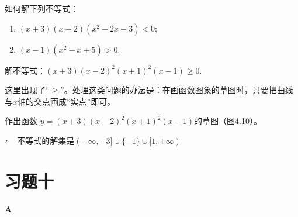 \begin{blk}
    如何解下列不等式：
    \begin{enumerate}[(1)]
        \item $(x+3)(x-2)(x^2-2x-3)<0$;
\item $(x-1)(x^2-x+5)>0$.
    \end{enumerate}
\end{blk}


\begin{example}
    解不等式：$(x+3)(x-2)^2(x+1)^2(x-1)\ge 0$.
\end{example}

\begin{analyze}
    这里出现了“$\ge $”。处理这类问题的办法是：在画函数图象的草图时，只要把曲线与$x$轴的交点画成“实点”即可。
\end{analyze}

\begin{solution}
    作出函数
$y=(x+3)(x-2)^2(x+1)^2(x-1)$的草图（图4.10）。

\begin{figure}[htp]
    \centering
{}
    \caption{}
\end{figure}

$\therefore\quad $不等式的解集是$(-\infty,-3]\cup\{-1\}\cup [1,+\infty)$
\end{solution}

\section*{习题十}
\begin{center}
    \bfseries A
\end{center}

